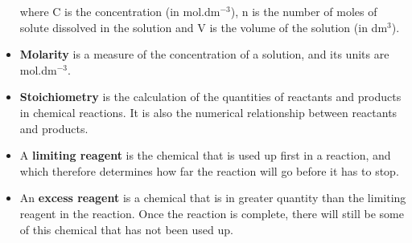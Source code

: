 \begin{itemize}
{where C is the concentration (in mol.dm$^{-3}$), n is the number of moles of solute dissolved in the solution and V is the volume of the solution (in dm$^{3}$).}
\item{\textbf{Molarity} is a measure of the concentration of a solution, and its units are mol.dm$^{-3}$.}
\item{\textbf{Stoichiometry} is the calculation of the quantities of reactants and products in chemical reactions. It is also the numerical relationship between reactants and products.}
\item{A \textbf{limiting reagent} is the chemical that is used up first in a reaction, and which therefore determines how far the reaction will go before it has to stop.}
\item{An \textbf{excess reagent} is a chemical that is in greater quantity than the limiting reagent in the reaction. Once the reaction is complete, there will still be some of this chemical that has not been used up.}
\end{itemize}

